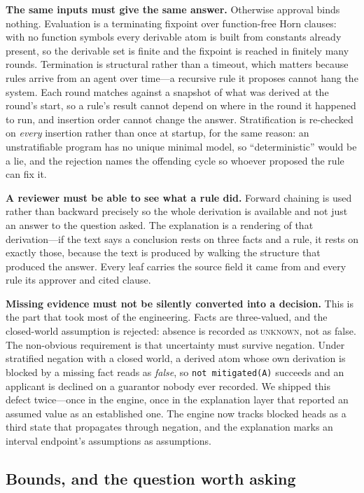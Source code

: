 \documentclass[sigconf,nonacm]{acmart}
\begin{document}
\textbf{The same inputs must give the same answer.} Otherwise approval binds
nothing. Evaluation is a terminating fixpoint over function-free Horn clauses:
with no function symbols every derivable atom is built from constants already
present, so the derivable set is finite and the fixpoint is reached in finitely
many rounds. Termination is structural rather than a timeout, which matters
because rules arrive from an agent over time---a recursive rule it proposes
cannot hang the system. Each round matches against a snapshot of what was
derived at the round's start, so a rule's result cannot depend on where in the
round it happened to run, and insertion order cannot change the answer.
Stratification is re-checked on \emph{every} insertion rather than once at
startup, for the same reason: an unstratifiable program has no unique minimal
model, so ``deterministic'' would be a lie, and the rejection names the offending
cycle so whoever proposed the rule can fix it.

\textbf{A reviewer must be able to see what a rule did.} Forward chaining is
used rather than backward precisely so the whole derivation is available and not
just an answer to the question asked. The explanation is a rendering of that
derivation---if the text says a conclusion rests on three facts and a rule, it
rests on exactly those, because the text is produced by walking the structure
that produced the answer. Every leaf carries the source field it came from and
every rule its approver and cited clause.

\textbf{Missing evidence must not be silently converted into a decision.} This
is the part that took most of the engineering. Facts are three-valued, and the
closed-world assumption is rejected: absence is recorded as \textsc{unknown},
not as false. The non-obvious requirement is that uncertainty must survive
negation. Under stratified negation with a closed world, a derived atom whose own
derivation is blocked by a missing fact reads as \emph{false}, so
\lstinline|not mitigated(A)| succeeds and an applicant is declined on a
guarantor nobody ever recorded. We shipped this defect twice---once in the
engine, once in the explanation layer that reported an assumed value as an
established one. The engine now tracks blocked heads as a third state that
propagates through negation, and the explanation marks an interval endpoint's
assumptions as assumptions.

\subsection{Bounds, and the question worth asking}
\end{document}
